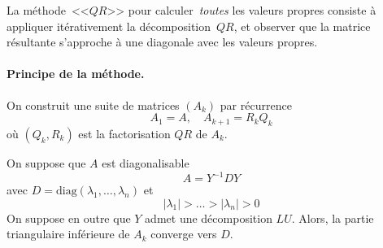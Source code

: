 La méthode~<<$QR$>> pour calculer~\emph{toutes} les valeurs propres consiste à
appliquer itérativement la décomposition~$QR$, et observer que la matrice
résultante s'approche à une diagonale avec les valeurs propres.

%
%
%

\paragraph*{Principe de la méthode.} On construit une suite de matrices $(A_k)$ par récurrence
\[
A_1 = A, \quad A_{k+1} = R_k Q_k
\]
où $(Q_k,R_k)$ est la factorisation $QR$ de $A_k$.

\begin{theorem}
\label{thm:QR}
On suppose que $A$ est diagonalisable
\[
A = Y^{-1} D Y
\]
avec $D = \textrm{diag}(\lambda_1,\dots,\lambda_n)$
et
\[
|\lambda_1| > \dots > |\lambda_n| > 0
\]
On suppose en outre que $Y$ admet une décomposition $LU$. Alors, la partie triangulaire inférieure de $A_k$ converge vers $D$.
\end{theorem}

